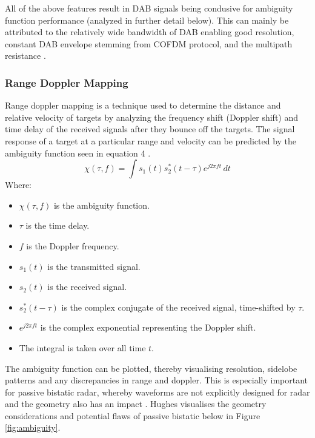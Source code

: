 \documentclass[12pt,a4paper]{article}
\begin{document}
\par \vspace{0.5cm} 
\noindent All of the above features result in DAB signals being condusive for ambiguity function performance (analyzed in further detail below). This can mainly be attributed to the relatively wide bandwidth of DAB enabling good resolution, constant DAB envelope stemming from COFDM protocol, and the multipath resistance \cite{DABambiguity}.
\subsubsection{Range Doppler Mapping}
Range doppler mapping is a technique used to determine the distance and relative velocity of targets by analyzing the frequency shift (Doppler shift) and time delay of the received signals after they bounce off the targets. The signal response of a target at a particular range and velocity can be predicted by the ambiguity function seen in equation 4 \cite{INTRO2017}. 
\begin{equation}
    \chi(\tau, f) = \int s_1(t) s_2^*(t - \tau) e^{j2\pi f t} \, dt
\end{equation}
Where:
\begin{multicols}{2}
\begin{itemize}
\item \( \chi(\tau, f) \) is the ambiguity function.
\item \( \tau \) is the time delay.
\item \( f \) is the Doppler frequency.
\item \( s_1(t) \) is the transmitted signal.
\item \( s_2(t) \) is the received signal.
\item \( s_2^*(t - \tau) \) is the complex conjugate of the received signal, time-shifted by \( \tau \).
\item \( e^{j2\pi f t} \) is the complex exponential representing the Doppler shift.
\item The integral is taken over all time \( t \).
\end{itemize}
\end{multicols}
\noindent The ambiguity function can be plotted, thereby visualising resolution, sidelobe patterns and any discrepancies in range and doppler. This is especially important for passive bistatic radar, whereby waveforms are not explicitly designed for radar and the geometry also has an impact \cite{FundamentalsPassiveRadar}. Hughes visualises the geometry considerations and potential flaws of passive bistatic below in Figure \ref{fig:ambiguity}.
\end{document}
